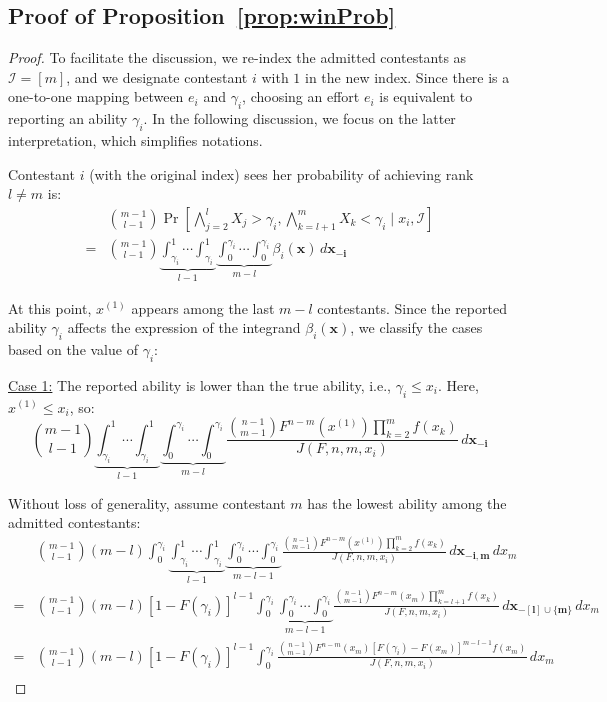 \subsection*{Proof of Proposition~\ref{prop:winProb}}
\begin{proof}
To facilitate the discussion, we re-index the admitted contestants as \(\mathcal{I} = [m]\), and we designate contestant \(i\) with \(1\) in the new index. Since there is a one-to-one mapping between $e_i$ and $\gamma_i$, choosing an effort \(e_i\) is equivalent to reporting an ability \(\gamma_i\). In the following discussion, we focus on the latter interpretation, which simplifies notations.

Contestant \(i\) (with the original index) sees her probability of achieving rank \(l \neq m\) is:
\[
\begin{aligned}
& \binom{m-1}{l-1} \Pr\left [ \bigwedge_{j=2}^{l}X_j > \gamma_i, \bigwedge_{k=l+1}^m X_k < \gamma_i \mid x_i, \mathcal{I} \right ] \\
= & \binom{m-1}{l-1} \underbrace{\int_{\gamma_i}^{1} \cdots \int_{\gamma_i}^{1}}_{l-1} \underbrace{\int_{0}^{\gamma_i} \cdots \int_{0}^{\gamma_i}}_{m-l} \beta_i(\mathbf{x}) \, d\mathbf{x_{-i}}
\end{aligned}
\]

At this point, \(x^{(1)}\) appears among the last \(m-l\) contestants. Since the reported ability \(\gamma_i\) affects the expression of the integrand \(\beta_i(\mathbf{x})\), we classify the cases based on the value of \(\gamma_i\):

\underline{Case 1:} The reported ability is lower than the true ability, i.e., \(\gamma_i \leq x_i\). Here, \(x^{(1)} \leq x_i\), so:
\[
\binom{m-1}{l-1} \underbrace{\int_{\gamma_i}^{1} \cdots \int_{\gamma_i}^{1}}_{l-1} \underbrace{\int_{0}^{\gamma_i} \cdots \int_{0}^{\gamma_i}}_{m-l} \frac{\binom{n-1}{m-1}F^{n-m}(x^{(1)})\prod_{k=2}^{m}f(x_k)}{J(F,n,m,x_i)} \, d\mathbf{x_{-i}}
\]

Without loss of generality, assume contestant \(m\) has the lowest ability among the admitted contestants:
\[
\begin{aligned}
& \binom{m-1}{l-1} (m-l) \int_{0}^{\gamma_i} \underbrace{\int_{\gamma_i}^{1} \cdots \int_{\gamma_i}^{1}}_{l-1} \underbrace{\int_{0}^{\gamma_i} \cdots \int_{0}^{\gamma_i}}_{m-l-1} \frac{\binom{n-1}{m-1}F^{n-m}(x^{(1)})\prod_{k=2}^{m}f(x_k)}{J(F,n,m,x_i)} \, d\mathbf{x_{-i,m}} \, dx_m \\
= & \binom{m-1}{l-1} (m-l) [1-F(\gamma_i)]^{l-1} \int_{0}^{\gamma_i} \underbrace{\int_{0}^{\gamma_i} \cdots \int_{0}^{\gamma_i}}_{m-l-1} \frac{\binom{n-1}{m-1}F^{n-m}(x_m)\prod_{k=l+1}^{m}f(x_k)}{J(F,n,m,x_i)} \, d\mathbf{x_{-[l]\cup{\{m\}}}} \, dx_m \\
= & \binom{m-1}{l-1} (m-l) [1-F(\gamma_i)]^{l-1} \int_{0}^{\gamma_i} \frac{\binom{n-1}{m-1}F^{n-m}(x_m)[F(\gamma_i)-F(x_m)]^{m-l-1}f(x_m)}{J(F,n,m,x_i)} \, dx_m \\
\end{aligned}
\]


\end{proof}
